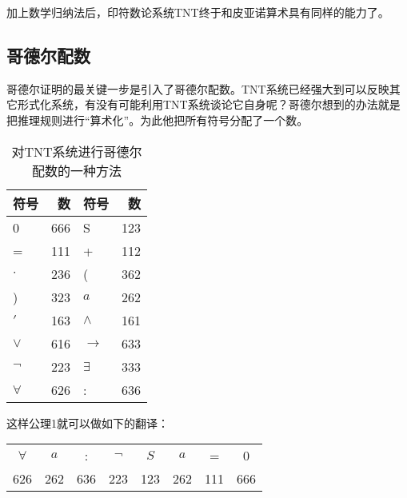 \documentclass[b5paper]{ctexart}
\begin{document}
加上数学归纳法后，印符数论系统TNT终于和皮亚诺算术具有同样的能力了。

\begin{Exercise}\label{ex:math-induction}
\end{Exercise}

\begin{Answer}[ref = {ex:math-induction}]
\end{Answer}

\subsection{哥德尔配数}
哥德尔证明的最关键一步是引入了哥德尔配数。TNT系统已经强大到可以反映其它形式化系统，有没有可能利用TNT系统谈论它自身呢？哥德尔想到的办法就是把推理规则进行“算术化”。为此他把所有符号分配了一个数。

\begin{table}[htbp]
\centering
\begin{tabular}{|l|r||l|r|}
\hline
\textbf{符号} & \textbf{数} & \textbf{符号} & \textbf{数} \\
\hline
0 & 666 & S & 123 \\
\hline
= & 111 & + & 112 \\
\hline
$\cdot$ & 236 & ( & 362 \\
\hline
) & 323 & $a$ & 262 \\
\hline
$'$ & 163 & $\land$ & 161 \\
\hline
$\lor$ & 616 & $\to$ & 633 \\
\hline
$\lnot$ & 223 & $\exists$ & 333 \\
\hline
$\forall$ & 626 & : & 636 \\
\hline
\end{tabular}
\caption{对TNT系统进行哥德尔配数的一种方法}
\end{table}

这样公理1就可以做如下的翻译：

\begin{tabular}{cccccccc}
$\forall$ & $a$ & : & $\lnot$ & $S$ & $a$ & = & 0 \\
626 & 262 & 636 & 223 & 123 & 262 & 111 & 666 \\
\end{tabular}
\end{document}
